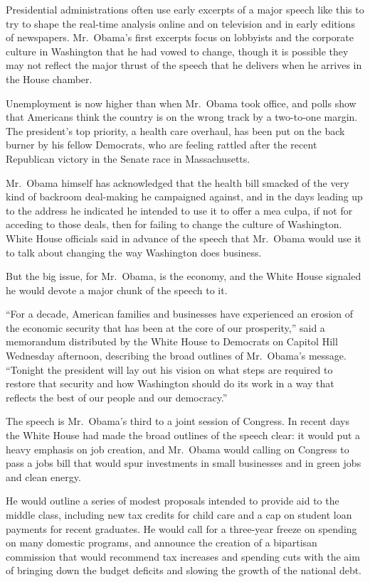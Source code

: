 ﻿\documentclass[12pt]{article}
\begin{document}
Presidential administrations often use early excerpts of a major speech like this to try to shape
the real-time analysis online and on television and in early editions of newspapers. Mr.~Obama's
first excerpts focus on lobbyists and the corporate culture in Washington that he had vowed to
change, though it is possible they may not reflect the major thrust of the speech that he delivers
when he arrives in the House chamber.

Unemployment is now higher than when Mr.~Obama took office, and polls show that Americans think the
country is on the wrong track by a two-to-one margin. The president's top priority, a health care
overhaul, has been put on the back burner by his fellow Democrats, who are feeling rattled after the
recent Republican victory in the Senate race in Massachusetts.

Mr.~Obama himself has acknowledged that the health bill smacked of the very kind of backroom
deal-making he campaigned against, and in the days leading up to the address he indicated he
intended to use it to offer a mea culpa, if not for acceding to those deals, then for failing to
change the culture of Washington. White House officials said in advance of the speech that Mr.~Obama
would use it to talk about changing the way Washington does business.

But the big issue, for Mr.~Obama, is the economy, and the White House signaled he would devote a
major chunk of the speech to it.

``For a decade, American families and businesses have experienced an erosion of the economic
security that has been at the core of our prosperity,'' said a memorandum distributed by the White
House to Democrats on Capitol Hill Wednesday afternoon, describing the broad outlines of Mr.~Obama's
message. ``Tonight the president will lay out his vision on what steps are required to restore that
security and how Washington should do its work in a way that reflects the best of our people and our
democracy.''

The speech is Mr.~Obama's third to a joint session of Congress. In recent days the White House had
made the broad outlines of the speech clear: it would put a heavy emphasis on job creation, and
Mr.~Obama would calling on Congress to pass a jobs bill that would spur investments in small
businesses and in green jobs and clean energy.

He would outline a series of modest proposals intended to provide aid to the middle class, including
new tax credits for child care and a cap on student loan payments for recent graduates. He would
call for a three-year freeze on spending on many domestic programs, and announce the creation of a
bipartisan commission that would recommend tax increases and spending cuts with the aim of bringing
down the budget deficits and slowing the growth of the national debt.
\end{document}
